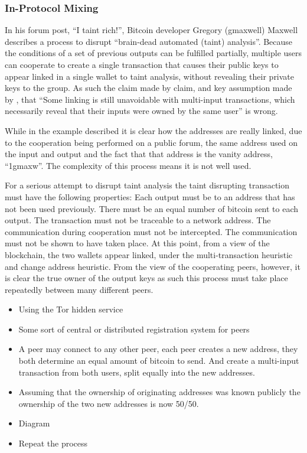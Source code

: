 \subsubsection{In-Protocol Mixing}
In his forum post, ``I taint rich!'', Bitcoin developer Gregory (gmaxwell)
Maxwell describes a process to disrupt ``brain-dead automated (taint)
analysis''.  Because the conditions of a set of previous outputs can be
fulfilled partially, multiple users can cooperate to create a single transaction
that causes their public keys to appear linked in a single wallet to taint
analysis, without revealing their private keys to the group.  As such the claim made by \textcite{satoshi}
claim, and key assumption made by \textcite{reid-anon}, that ``Some linking is
still unavoidable with multi-input transactions, which necessarily reveal that
their inputs were owned by the same user'' is wrong.

While in the example described it is clear how the addresses are really linked,
due to the cooperation being performed on a public forum, the same address used
on the input and output and the fact that that address is the vanity address,
``1gmaxw''. The complexity of this process means it is not well used.

For a serious attempt to disrupt taint analysis the taint disrupting transaction
must have the following properties:  Each output must be to an address that has
not been used previously. There must be an equal number of bitcoin sent to each
output. The transaction must not be traceable to a network address.  The
communication during cooperation must not be intercepted. The communication must
not be shown to have taken place.  At this point, from a view of the blockchain,
the two wallets appear linked, under the multi-transaction heuristic and change
address heuristic. From the view of the cooperating peers, however, it is clear
the true owner of the output keys as such this process must take place
repeatedly between many different peers.

\begin{itemize} \item Using the Tor hidden service \item Some sort of central or
        distributed registration system for peers \item A peer may connect to
            any other peer, each peer creates a new address, they both determine
            an equal amount of bitcoin to send. And create a multi-input
            transaction from both users, split equally into the new addresses.
\item Assuming that the ownership of originating addresses was known publicly
the ownership of the two new addresses is now 50/50.  \item Diagram \item Repeat
the process \end{itemize}

